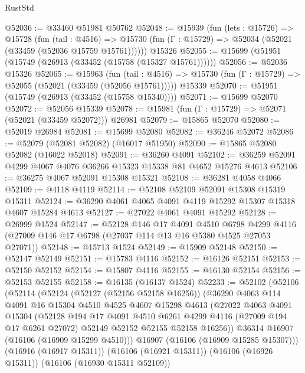 \begin{lexlean}{RustStd}
\begin{coremodule}
@52036 := @33460 @51981 @50762
@52048 := @15939
    (fun (lets : @15726) =>
    @15728
      (fun (tail : @4516) =>
      @15730 (fun (Γ : @15729) => @52034 (@52021 (@33459 (@52036 @15759 @15761))))))
    @15326
@52055 := @15699 (@51951 (@15749 (@26913 (@33452 (@15758 (@15327 @15761))))))
@52056 := @52036 @15326
@52065 := @15963
    (fun (tail : @4516) => @15730 (fun (Γ : @15729) => @52055 (@52021 (@33459 (@52056 @15761)))))
    @15339
@52070 := @51951 (@15749 (@26913 (@33452 (@15758 @15340))))
@52071 := @15699 @52070
@52072 := @52056 @15339
@52078 := @15981 (fun (Γ : @15729) => @52071 (@52021 (@33459 @52072))) @26981
@52079 := @15865 @52070
@52080 := @52019 @26984
@52081 := @15699 @52080
@52082 := @36246 @52072
@52086 := @52079 (@52081 @52082) (@16017 @51950)
@52090 := @15865 @52080 @52082 (@16022 @52018)
@52091 := @36260 @4091
@52102 := @36259 @52091 @4299 @4067 @4076 @36266 @15323 @15338 @81 @4652 @15276 @4613
@52106 := @36275 @4067 @52091 @15308 @15321
@52108 := @36281 @4058 @4066
@52109 := @4118 @4119
@52114 := @52108 @52109 @52091 @15308 @15319 @15311
@52124 := @36290 @4061 @4065 @4091 @4119 @15292 @15307 @15318 @4607 @15284 @4613
@52127 := @27022 @4061 @4091 @15292
@52128 := @26999 @1524
@52147 := @52128
    @146
    @17
    @4091
    @4510
    @6798
    @4299
    @4116
    (@27009 @146 @17 @6798 (@27037 @114 @13 @16 @5380 @4525 @27053 @27071))
@52148 := @15713 @1524
@52149 := @15909 @52148
@52150 := @52147 @52149
@52151 := @15783 @4116
@52152 := @16126 @52151
@52153 := @52150 @52152
@52154 := @15807 @4116
@52155 := @16130 @52154
@52156 := @52153 @52155
@52158 := @16135 (@16137 @1524)
@52233 := @52102
    (@52106
      (@52114
        (@52124
          (@52127 (@52156 @52158 @16256))
          (@36290
            @4063
            @114
            @4091
            @16
            @15304
            @4510
            @4525
            @4607
            @15298
            @4613
            (@27022
              @4063
              @4091
              @15304
              (@52128
                @194
                @17
                @4091
                @4510
                @6261
                @4299
                @4116
                (@27009 @194 @17 @6261 @27072)
                @52149
                @52152
                @52155
                @52158
                @16256))
            @36314
            @16907
            (@16106 (@16909 @15299 @4510)))
          @16907
          (@16106 (@16909 @15285 @15307)))
        (@16916 (@16917 @15311))
        (@16106 (@16921 @15311))
        (@16106 (@16926 @15311))
        (@16106 (@16930 @15311 @52109))

\end{coremodule}
\end{lexlean}
